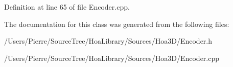 Definition at line 65 of file Encoder.\-cpp.



The documentation for this class was generated from the following files\-:\begin{DoxyCompactItemize}
\item 
/\-Users/\-Pierre/\-Source\-Tree/\-Hoa\-Library/\-Sources/\-Hoa3\-D/Encoder.\-h\item 
/\-Users/\-Pierre/\-Source\-Tree/\-Hoa\-Library/\-Sources/\-Hoa3\-D/Encoder.\-cpp\end{DoxyCompactItemize}
